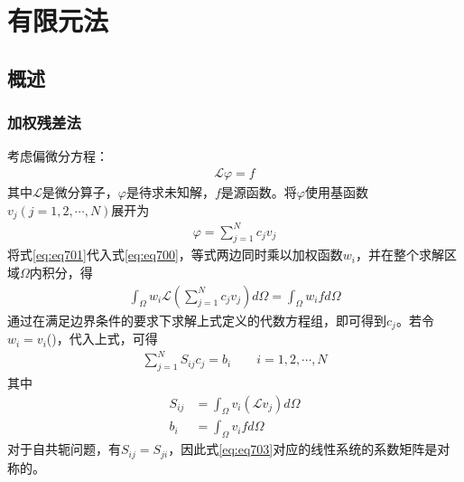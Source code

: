 \documentclass{article}
\numberwithin{equation}{section}
\renewcommand{\vec}[1]{\boldsymbol{#1}}
\begin{document}
\section{\textsf{有限元法}}
\subsection{概述}
\subsubsection{加权残差法}
考虑偏微分方程：
\begin{align}
    \label{eq:eq700}
    \vec{\mathcal{L}}\varphi=f
\end{align}
其中$\vec{\mathcal{L}}$是微分算子，$\varphi$是待求未知解，$f$是源函数。将$\varphi$使用基函数$v_j(j=1,2,\cdots,N)$展开为
\begin{align}
    \label{eq:eq701}
    \varphi=\sum_{j=1}^{N}c_jv_j
\end{align}
将式\ref{eq:eq701}代入式\ref{eq:eq700}，等式两边同时乘以加权函数$w_i$，并在整个求解区域$\Omega$内积分，得
\begin{align}
    \label{eq:eq702}
    \int_{\Omega}w_i\vec{\mathcal{L}}\left(\sum_{j=1}^{N}c_jv_j\right)d\Omega=\int_{\Omega}w_ifd\Omega
\end{align}
通过在满足边界条件的要求下求解上式定义的代数方程组，即可得到$c_j$。若令$w_i=v_i$(\textbf{\color{blue}{伽辽金法}})，代入上式，可得
\begin{align}
    \label{eq:eq703}
    \sum_{j=1}^{N}S_{ij}c_j=b_i\qquad i=1,2,\cdots,N
\end{align}
其中
\begin{align}
    \label{eq:eq704}
    S_{ij}&=\int_{\Omega}v_i\left(\vec{\mathcal{L}}v_j\right)d\Omega \\
    \label{eq:eq705}
    b_i&=\int_{\Omega}v_ifd\Omega
\end{align}
对于自共轭问题，有$S_{ij}=S_{ji}$，因此式\ref{eq:eq703}对应的线性系统的系数矩阵是对称的。
\end{document}
